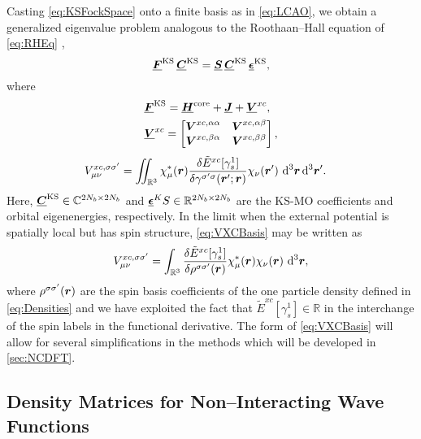 Casting \cref{eq:KSFockSpace} onto a finite basis as in \cref{eq:LCAO}, we obtain a generalized eigenvalue problem analogous to
the Roothaan--Hall equation of \cref{eq:RHEq} ,
\begin{equation}
\label{eq:RH-KSEq}
\boldsymbol{\underline{F}}^{\mathrm{KS}} \,\boldsymbol{\underline{C}}^{\mathrm{KS}} = \boldsymbol{\underline{S}}\, \boldsymbol{\underline{C}}^{\mathrm{KS}}\, \boldsymbol{\underline{\epsilon}}^{\mathrm{KS}},
\end{equation}
where
\begin{align}
  &\boldsymbol{\underline{F}}^{\mathrm{KS}} = \boldsymbol{\underline{H}}^\mathrm{core} + \boldsymbol{\underline{J}} + \boldsymbol{\underline{V}}^{xc},\label{eq:KSMat} \\
  &\boldsymbol{\underline{V}}^{xc} = \begin{bmatrix} \boldsymbol{V}^{xc,{\alpha\alpha}} & \boldsymbol{V}^{xc,{\alpha\beta}} \\ \boldsymbol{V}^{xc,{\beta\alpha}} & \boldsymbol{V}^{xc,{\beta\beta}} \end{bmatrix},
\end{align}
\begin{align}
    \label{eq:VXCBasisNonLocal}
    &V^{xc,\sigma\sigma'}_{\mu\nu} =
    \int\mkern-12mu\int_{\mathbb R^3} \chi^*_\mu(\boldsymbol{r}) \frac{\delta \tilde E^{xc}[\gamma^1_s]}{\delta \gamma^{\sigma'\sigma}(\boldsymbol{r}';\boldsymbol{r})} \chi_\nu(\boldsymbol{r}')\,\,\mathrm{d}^3\boldsymbol{r}\,\mathrm{d}^3\boldsymbol{r}'.
\end{align}
Here, $\boldsymbol{\underline{C}}^{\mathrm{KS}} \in \mathbb{C}^{2N_b \times 2N_b}$ and $\boldsymbol{\underline{\epsilon}}^KS \in \mathbb{R}^{2N_b \times 2N_b}$ are the KS-MO
coefficients and orbital eigenenergies, respectively. In the limit when the external potential
is spatially local but has spin structure, \cref{eq:VXCBasis} may be written as
\begin{equation}
    \label{eq:VXCBasis}
    V^{xc,\sigma\sigma'}_{\mu\nu} =
    \int_{\mathbb R^3} \frac{\delta \tilde E^{xc}[\gamma^1_s]}{\delta \rho^{\sigma\sigma'}(\boldsymbol{r})} \chi^*_\mu(\boldsymbol{r})  \chi_\nu(\boldsymbol{r})\,\,\mathrm{d}^3\boldsymbol{r},
\end{equation}
where $\rho^{\sigma\sigma'}(\boldsymbol{r})$ are the spin basis coefficients of the one particle density defined in \cref{eq:Densities}
and we have exploited the fact that $\tilde E^{xc}[\gamma^1_s] \in \mathbb{R}$ in the interchange of the spin labels in
the functional derivative. The form of \cref{eq:VXCBasis} will allow for several simplifications
in the methods which will be developed in \cref{sec:NCDFT}.


\subsection{Density Matrices for Non--Interacting Wave Functions}

